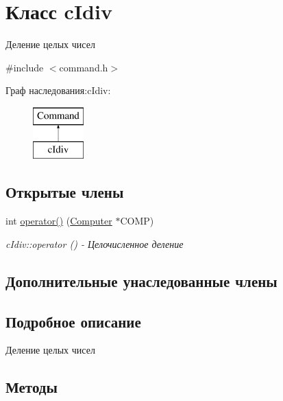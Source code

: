 \hypertarget{classc_idiv}{}\section{Класс c\+Idiv}
\label{classc_idiv}


Деление целых чисел  




{\ttfamily \#include $<$command.\+h$>$}

Граф наследования\+:c\+Idiv\+:\begin{figure}[H]
\begin{center}
\leavevmode
\includegraphics[height=2.000000cm]{classc_idiv}
\end{center}
\end{figure}
\subsection*{Открытые члены}
\begin{DoxyCompactItemize}
\item 
int \hyperlink{classc_idiv_ae7b137fbea1950b954729c2040be22d5}{operator()} (\hyperlink{class_computer}{Computer} $\ast$C\+O\+MP)
\begin{DoxyCompactList}\small\item\em c\+Idiv\+::operator () -\/ Целочисленное деление \end{DoxyCompactList}\end{DoxyCompactItemize}
\subsection*{Дополнительные унаследованные члены}


\subsection{Подробное описание}
Деление целых чисел 

\subsection{Методы}
\hypertarget{classc_idiv_ae7b137fbea1950b954729c2040be22d5}{}\label{classc_idiv_ae7b137fbea1950b954729c2040be22d5} 
